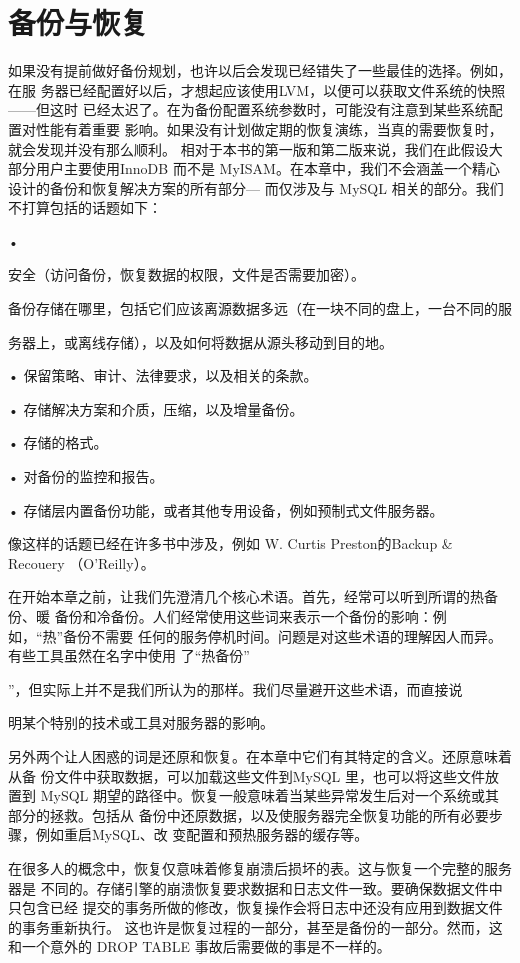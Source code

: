 \chapter{备份与恢复}
如果没有提前做好备份规划，也许以后会发现已经错失了一些最佳的选择。例如，在服
务器已经配置好以后，才想起应该使用LVM，以便可以获取文件系统的快照——但这时
已经太迟了。在为备份配置系统参数时，可能没有注意到某些系统配置对性能有着重要
影响。如果没有计划做定期的恢复演练，当真的需要恢复时，就会发现并没有那么顺利。
相对于本书的第一版和第二版来说，我们在此假设大部分用户主要使用InnoDB 而不是
MyISAM。在本章中，我们不会涵盖一个精心设计的备份和恢复解决方案的所有部分—
而仅涉及与 MySQL 相关的部分。我们不打算包括的话题如下：

•

安全（访问备份，恢复数据的权限，文件是否需要加密）。

备份存储在哪里，包括它们应该离源数据多远（在一块不同的盘上，一台不同的服

务器上，或离线存储），以及如何将数据从源头移动到目的地。

• 保留策略、审计、法律要求，以及相关的条款。

• 存储解决方案和介质，压缩，以及增量备份。

• 存储的格式。

• 对备份的监控和报告。

• 存储层内置备份功能，或者其他专用设备，例如预制式文件服务器。

像这样的话题已经在许多书中涉及，例如 W. Curtis Preston的Backup & Recouery
（O'Reilly）。

在开始本章之前，让我们先澄清几个核心术语。首先，经常可以听到所谓的热备份、暖
备份和冷备份。人们经常使用这些词来表示一个备份的影响：例如，“热”备份不需要
任何的服务停机时间。问题是对这些术语的理解因人而异。有些工具虽然在名字中使用
了“热备份”

”，但实际上并不是我们所认为的那样。我们尽量避开这些术语，而直接说

明某个特别的技术或工具对服务器的影响。

另外两个让人困惑的词是还原和恢复。在本章中它们有其特定的含义。还原意味着从备
份文件中获取数据，可以加载这些文件到MySQL 里，也可以将这些文件放置到 MySQL
期望的路径中。恢复一般意味着当某些异常发生后对一个系统或其部分的拯救。包括从
备份中还原数据，以及使服务器完全恢复功能的所有必要步骤，例如重启MySQL、改
变配置和预热服务器的缓存等。

在很多人的概念中，恢复仅意味着修复崩溃后损坏的表。这与恢复一个完整的服务器是
不同的。存储引擎的崩溃恢复要求数据和日志文件一致。要确保数据文件中只包含已经
提交的事务所做的修改，恢复操作会将日志中还没有应用到数据文件的事务重新执行。
这也许是恢复过程的一部分，甚至是备份的一部分。然而，这和一个意外的 DROP TABLE
事故后需要做的事是不一样的。

